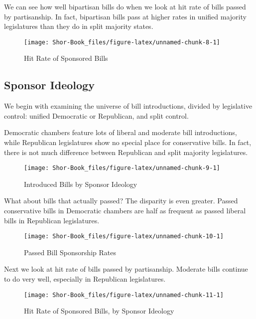 \documentclass[
  oneside]{book}
\begin{document}
We can see how well bipartisan bills do when we look at hit rate of bills passed by partisanship. In fact, bipartisan bills pass at higher rates in unified majority legislatures than they do in split majority states.

\begin{figure}
\texttt{[image: Shor-Book\_files/figure-latex/unnamed-chunk-8-1]} \caption{Hit Rate of Sponsored Bills}\label{fig:unnamed-chunk-8}
\end{figure}

\hypertarget{sponsor-ideology}{%
\subsection{Sponsor Ideology}\label{sponsor-ideology}}

We begin with examining the universe of bill introductions, divided by legislative control: unified Democratic or Republican, and split control.

Democratic chambers feature lots of liberal and moderate bill introductions, while Republican legislatures show no special place for conservative bills. In fact, there is not much difference between Republican and split majority legislatures.

\begin{figure}
\texttt{[image: Shor-Book\_files/figure-latex/unnamed-chunk-9-1]} \caption{Introduced Bills by Sponsor Ideology}\label{fig:unnamed-chunk-9}
\end{figure}

What about bills that actually passed? The disparity is even greater. Passed conservative bills in Democratic chambers are half as frequent as passed liberal bills in Republican legislatures.

\begin{figure}
\texttt{[image: Shor-Book\_files/figure-latex/unnamed-chunk-10-1]} \caption{Passed Bill Sponsorship Rates}\label{fig:unnamed-chunk-10}
\end{figure}

Next we look at hit rate of bills passed by partisanship. Moderate bills continue to do very well, especially in Republican legislatures.

\begin{figure}
\texttt{[image: Shor-Book\_files/figure-latex/unnamed-chunk-11-1]} \caption{Hit Rate of Sponsored Bills, by Sponsor Ideology}\label{fig:unnamed-chunk-11}
\end{figure}
\end{document}
